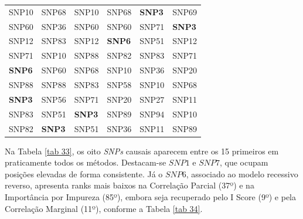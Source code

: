 \documentclass[12pt,fleqn]{article}
\begin{document}
\begin{table}[H]
\begin{tabular}{l|l|l|l|l|l}
  SNP10 & SNP68 & SNP10 & SNP68 & \textbf{SNP3} & SNP69 \\
  SNP60 & SNP36 & SNP60 & SNP60 & SNP71 & \textbf{SNP3} \\
  SNP12 & SNP83 & SNP12 & \textbf{SNP6} & SNP51 & SNP12 \\
  SNP71 & SNP10 & SNP88 & SNP82 & SNP83 & SNP71 \\
  \textbf{SNP6} & SNP60 & SNP68 & SNP10 & SNP36 & SNP20 \\
  SNP88 & SNP88 & SNP83 & SNP58 & SNP10 & SNP68 \\
  \textbf{SNP3} & SNP56 & SNP71 & SNP20 & SNP27 & SNP11 \\
  SNP83 & SNP51 & \textbf{SNP3} & SNP89 & SNP94 & SNP10 \\
  SNP82 & \textbf{SNP3} & SNP51 & SNP36 & SNP11 & SNP89 \\
   \hline
\end{tabular}
\end{table}

Na Tabela \ref{tab 33}, os oito \emph{SNPs} causais aparecem entre os 15 primeiros em praticamente todos os métodos. Destacam-se $SNP1$ e $SNP7$, que ocupam posições elevadas de forma consistente. Já o $SNP6$, associado ao modelo recessivo reverso, apresenta ranks mais baixos na Correlação Parcial (37º) e na Importância por Impureza (85º), embora seja recuperado pelo I Score (9º) e pela Correlação Marginal (11º), conforme a Tabela \ref{tab 34}.
\end{document}
